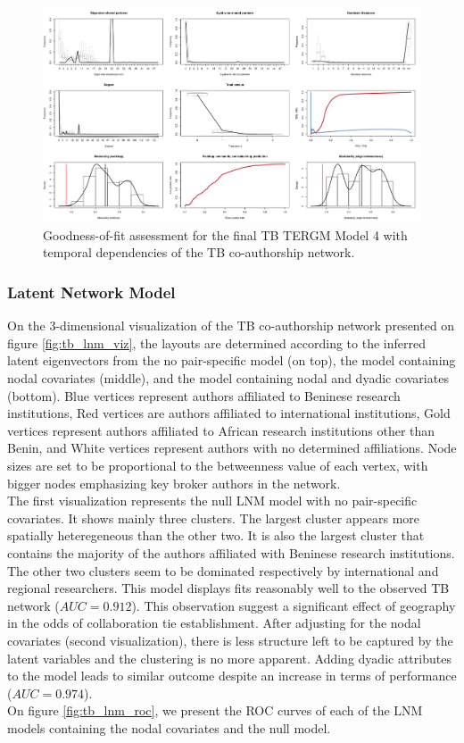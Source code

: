 \begin{figure}[!h]
\centering
\hspace*{-1cm}
\includegraphics[scale=0.4]{Chapters/tb/statMod/tb_tergm_gof}
\caption{Goodness-of-fit assessment for the final TB TERGM Model 4 with temporal dependencies of the TB co-authorship network.}
\label{fig:tb_tergm-gof}
\end{figure}

\pagebreak
\subsubsection{Latent Network Model}
\label{tb_sec:results_lnm}
On the 3-dimensional visualization of the TB co-authorship network presented on figure \ref{fig:tb_lnm_viz}, the layouts are determined according to the inferred latent eigenvectors from the no pair-specific model (on top), the model containing nodal covariates (middle), and the model containing nodal and dyadic covariates (bottom). Blue vertices represent authors affiliated to Beninese research institutions, Red vertices are authors affiliated to international institutions, Gold vertices represent authors affiliated to African research institutions other than Benin, and White vertices represent authors with no determined affiliations. Node sizes are set to be proportional to the betweenness value of each vertex, with bigger nodes emphasizing key broker authors in the network. \\
The first visualization represents the null LNM model with no pair-specific covariates. It shows mainly three clusters. The largest cluster appears more spatially heteregeneous than the other two. It is also the largest cluster that contains the majority of the authors affiliated with Beninese research institutions. The other two clusters seem to be dominated respectively by international and regional researchers. This model displays fits reasonably well to the observed TB network ($AUC=0.912$).  This observation suggest a significant effect of geography in the odds of collaboration tie establishment. After adjusting for the nodal covariates (second visualization), there is less structure left to be captured by the latent variables and the clustering is no more apparent. Adding dyadic attributes to the model leads to similar outcome despite an increase in terms of performance ($AUC=0.974$). \\
On figure \ref{fig:tb_lnm_roc}, we present the ROC curves of each of the LNM models containing the nodal covariates and the null model.


